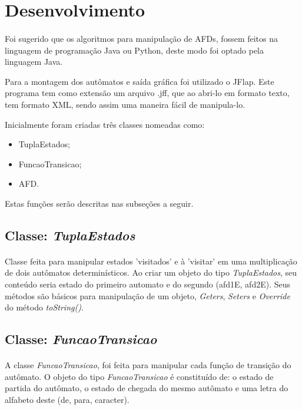 \documentclass[a4paper,portuguese,12pt]{article}
\begin{document}
\section{Desenvolvimento}
\paragraph{}Foi sugerido que os algoritmos para manipulação de AFDs, fossem feitos na linguagem de programação Java ou Python, deste modo foi optado pela linguagem Java.

Para a montagem dos autômatos e saída gráfica foi utilizado o JFlap. Este programa tem como extensão um arquivo .jff, que ao abri-lo em formato texto, tem formato XML, sendo assim uma maneira fácil de manipula-lo.  

Inicialmente foram criadas três classes nomeadas como:
\begin{itemize}
	\item TuplaEstados;
	\item FuncaoTransicao;
	\item AFD.
\end{itemize}

Estas funções serão descritas nas subseções a seguir.

\subsection{Classe: \textit{TuplaEstados}}
\paragraph{}Classe feita para manipular estados 'visitados' e à 'visitar' em uma multiplicação de dois autômatos determinísticos. Ao criar um objeto do tipo \textit{TuplaEstados}, seu conteúdo seria estado do primeiro automato e do segundo (afd1E, afd2E). Seus métodos são básicos para manipulação de um objeto, \textit{Geters}, \textit{Seters} e \textit{Override} do método \textit{toString()}.

\subsection{Classe: \textit{FuncaoTransicao}}
\paragraph{}A classe \textit{FuncaoTransicao}, foi feita para manipular cada função de transição do autômato. O objeto do tipo \textit{FuncaoTransicao} é constituído de: o estado de partida do autômato, o estado de chegada do mesmo autômato e uma letra do alfabeto deste (de, para, caracter).
\end{document}
